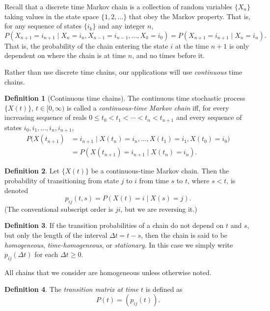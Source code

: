\documentclass[12pt]{article}
\theoremstyle{definition}
\newtheorem{defn}{Definition}
\begin{document}
Recall that a discrete time Markov chain is a collection of random variables
$\{X_n\}$ taking values in the state space $\{1, 2, \dots\}$ that obey the
Markov property. That is, for any sequence of states $\{i_k\}$ and any integer
$n$, $$P(X_{n + 1} = i_{n + 1} \mid X_n = i_n, X_{n - 1} = i_{n - 1}, \dots,
X_0 = i_0) = P(X_{n + 1} = i_{n + 1} \mid X_n = i_n).$$ That is, the
probability of the chain entering the state $i$ at the time $n + 1$ is only
dependent on where the chain is at time $n$, and no times before it.

Rather than use discrete time chains, our applications will use
\emph{continuous} time chains.

\begin{defn}[Continuous time chains]
    \label{defn:continuous-chain}
    The continuous time stochastic process $\{X(t)\}$, $t \in [0, \infty)$ is
    called a \emph{continuous-time Markov chain} iff, for every increasing
    sequence of reals $0 \leq t_0 < t_1 < \cdots < t_n < t_{n + 1}$ and every
    sequence of states $i_0, i_1, \dots, i_n, i_{n + 1}$,
    \begin{align*}
    P(X(t_{n + 1}) &= i_{n + 1} \mid X(t_n) = i_n, \dots, X(t_1) = i_1, X(t_0)
    = i_0) \\
    &= P(X(t_{n + 1}) = i_{n + 1} \mid X(t_n) = i_n).
    \end{align*}
\end{defn}

\begin{defn}
    \label{defn:transition-probs}
    Let $\{X(t)\}$ be a continuous-time Markov chain. Then the probability of
    transitioning from state $j$ to $i$ from time $s$ to $t$, where $s < t$, is
    denoted $$p_{ij}(t, s) = P(X(t) = i \mid X(s) = j).$$ (The conventional
    subscript order is $ji$, but we are reversing it.)
\end{defn}

\begin{defn}
    \label{defn:homogenous-chain}
    If the transition probabilities of a chain do not depend on $t$ and $s$,
    but only the length of the interval $\Delta t = t - s$, then the chain is
    said to be \emph{homogeneous}, \emph{time-homogeneous}, or
    \emph{stationary}. In this case we simply write $p_{ij}(\Delta t)$ for each
    $\Delta t \geq 0$.
\end{defn}

All chains that we consider are homogeneous unless otherwise noted.

\begin{defn}
    \label{defn:transition-matrix}
    The \emph{transition matrix at time $t$} is defined as $$P(t) =
    (p_{ij}(t)).$$
\end{defn}
\end{document}
